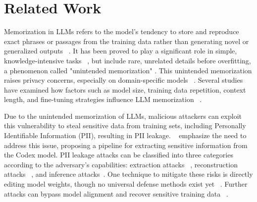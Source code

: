 \section{Related Work}
Memorization in LLMs refers to the model's tendency to store and reproduce exact phrases or passages from the training data rather than generating novel or generalized outputs ~\citep{satvaty2024undesirablememorizationlargelanguage}. It has been proved to play a significant role in simple, knowledge-intensive tasks ~\citep{wang2024generalizationvsmemorizationtracing}, but include rare, unrelated details before overfitting, a phenomenon called "unintended memorization" \citep{carlini2019secret}. This unintended memorization raises privacy concerns, especially on domain-specific models ~\citep{yang2024memorization}. Several studies have examined how factors such as model size, training data repetition, context length, and fine-tuning strategies influence LLM memorization ~\citep{carlini2023quantifyingmemorizationneurallanguage, mireshghallah2022empirical, zeng2024exploringmemorizationfinetunedlanguage}.



Due to the unintended memorization of LLMs, malicious attackers can exploit this vulnerability to steal sensitive data from training sets, including Personally Identifiable Information (PII), resulting in PII leakage. ~\citealp{291327} emphasize the need to address this issue, proposing a pipeline for extracting sensitive information from the Codex model. PII leakage attacks can be classified into three categories according to the adversary’s capabilities: extraction attacks ~\citep{carlini2021extracting, mireshghallah2022empirical, yu2023bagtrickstrainingdata, zhang2023ethicisttargetedtrainingdata}, reconstruction attacks ~\citep{inan2021training, lukas2023analyzing}, and inference attacks~\citep{mireshghallah2022quantifying, fu2024membership}. One technique to mitigate these risks is directly editing model weights, though no universal defense methods exist yet ~\citep{patil2023sensitiveinformationdeletedllms}. Further attacks can bypass model alignment and recover sensitive training data ~\citep{nasr2025scalable}.